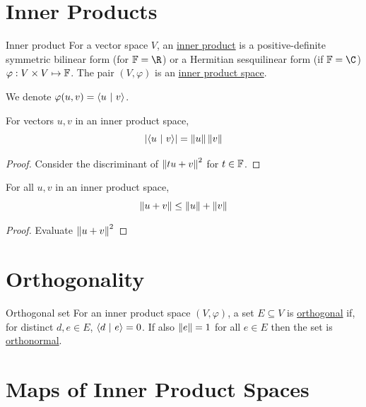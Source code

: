 \documentclass[../Main.tex]{subfiles}
\begin{document}
\section{Inner Products}
\begin{definition}{Inner product}
    For a vector space $V$, an \underline{inner product} is a positive-definite symmetric bilinear form (for $\F = \R$) or a Hermitian sesquilinear form (if $\F = \C$) $\varphi : V \times V \mapsto \mathbb{F}$. The pair $(V, \varphi)$ is an \underline{inner product space}.
\end{definition}
We denote $\varphi(u, v) = \left\langle u~\vert~v\right\rangle$.

\begin{lemma}
    For vectors $u, v$ in an inner product space,
    \begin{equation*}
        \lvert\left\langle u~\vert~v\right\rangle\rvert = \left\|u\right\| \left\|v\right\|
    \end{equation*}
    \label{lemCauchySchwarz}
\end{lemma}
\begin{proof}
    Consider the discriminant of $\left\|tu + v\right\|^2$ for $t \in \mathbb{F}$.
\end{proof}
\begin{corollary}
    For all $u, v$ in an inner product space,
    \begin{equation*}
        \left\|u + v\right\| \leq \left\|u\right\| + \left\|v\right\|
    \end{equation*}
    \label{corTriangleIneq}
\end{corollary}
\begin{proof}
    Evaluate $\left\|u + v\right\|^2$
\end{proof}
\section{Orthogonality}
\begin{definition}{Orthogonal set}
    For an inner product space $(V, \varphi)$, a set $E \subseteq V$ is \underline{orthogonal} if, for distinct $d, e \in E$, $\left\langle d~\vert~e\right\rangle = 0$. If also $\left\|e\right\| = 1$ for all $e\in E$ then the set is \underline{orthonormal}.
\end{definition}
\section{Maps of Inner Product Spaces}
\end{document}
